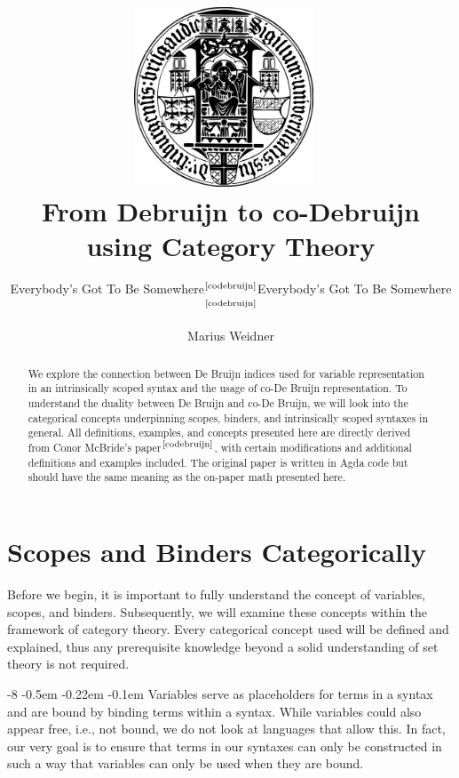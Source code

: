 \documentclass[runningheads]{llncs}
\subtitle{Everybody's Got To Be Somewhere$^{\text{\cite{codebruijn}}}$}
\title{\includegraphics[width=0.4\textwidth]{seal.png}~\\[1cm] From Debruijn to co-Debruijn using Category Theory}
\subtitle{Everybody's Got To Be Somewhere$^{\text{\cite{codebruijn}}}$}
\institute{Chair of Programming Languages, University of Freiburg \\
  \email{weidner@cs.uni-freiburg.de}}
\author{Marius Weidner}
\begin{document}
\let\oldaddcontentsline\addcontentsline{}
\def\addcontentsline#1#2#3{}
\maketitle
\def\addcontentsline#1#2#3{\oldaddcontentsline{#1}{#2}{#3}}

\makeatletter
\renewcommand\subsubsection{\@startsection{subsubsection}{3}{\z@}%
  {-8\p@ \@plus -4\p@ \@minus -4\p@}%
  {-0.5em \@plus -0.22em \@minus -0.1em}%
  {\normalfont\normalsize\bfseries\boldmath}}
\makeatother

\begin{abstract}
  We explore the connection between De Bruijn indices used for variable representation in an intrinsically scoped syntax and the usage of co-De Bruijn representation.
  To understand the duality between De Bruijn and co-De Bruijn, we will look into the categorical concepts underpinning scopes, binders, and intrinsically scoped syntaxes in general.
  All definitions, examples, and concepts presented here are directly derived from Conor McBride's paper$^{\text{\cite{codebruijn}}}$, with certain modifications and additional definitions and examples included.
  The original paper is written in Agda code but should have the same meaning as the on-paper math presented here.
\end{abstract}

\setcounter{tocdepth}{2}
\tableofcontents

\section{Scopes and Binders Categorically}
Before we begin, it is important to fully understand the concept of variables, scopes, and binders.
Subsequently, we will examine these concepts within the framework of category theory.
Every categorical concept used will be defined and explained, thus any prerequisite knowledge beyond a solid understanding of set theory is not required.

\subsubsection{Variables}
serve as placeholders for terms in a syntax and are bound by binding terms within a syntax.
While variables could also appear free, i.e., not bound, we do not look at languages that allow this.
In fact, our very goal is to ensure that terms in our syntaxes can only be constructed in such a way that variables can only be used when they are bound.
\end{document}
